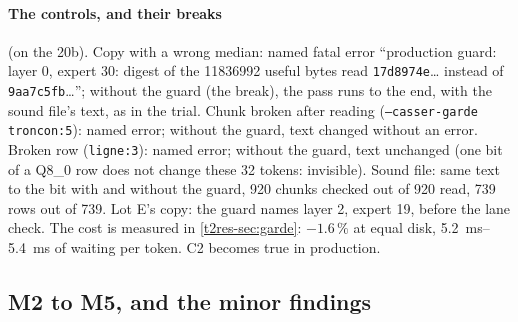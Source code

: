 \paragraph{The controls, and their breaks} (on the 20b). Copy with a wrong median: named fatal error ``production guard: layer 0, expert 30: digest of the \num{11836992} useful bytes read \texttt{17d8974e}… instead of \texttt{9aa7c5fb}…''; without the guard (the break), the pass runs to the end, with the sound file's text, as in the trial. Chunk broken after reading (\texttt{--casser-garde troncon:5}): named error; without the guard, text changed without an error. Broken row (\texttt{ligne:3}): named error; without the guard, text unchanged (one bit of a Q8\_0 row does not change these 32 tokens: invisible). Sound file: same text to the bit with and without the guard, 920 chunks checked out of 920 read, 739 rows out of 739. Lot E's copy: the guard names layer 2, expert 19, before the lane check. The cost is measured in \cref{t2res-sec:garde}: $-1.6\,\%$ at equal disk, \SIrange{5.2}{5.4}{\milli\second} of waiting per token. C2 becomes true in production.

\subsection{M2 to M5, and the minor findings}\label{t2e-sec:m2-m5}

